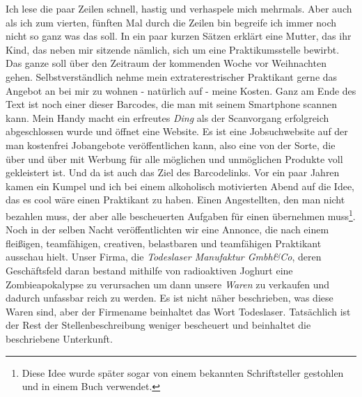 \documentclass[11pt]{article}
\begin{document}
\noindent Ich lese die paar Zeilen schnell, hastig und verhaspele mich
mehrmals. Aber auch als ich zum vierten, fünften Mal durch die Zeilen
bin begreife ich immer noch nicht so ganz was das soll. In ein paar
kurzen Sätzen erklärt eine Mutter, das ihr Kind, das neben mir
sitzende nämlich, sich um eine Praktikumsstelle bewirbt. Das ganze
soll über den Zeitraum der kommenden Woche vor Weihnachten gehen. 
Selbstverständlich nehme mein extraterestrischer Praktikant gerne das
Angebot an bei mir zu wohnen - natürlich auf - meine Kosten. 
Ganz am Ende des Text ist noch einer dieser Barcodes,
die man mit seinem Smartphone scannen kann. 
Mein Handy macht ein erfreutes \emph{Ding} als der Scanvorgang
erfolgreich abgeschlossen wurde und öffnet eine Website. Es ist eine
Jobsuchwebsite auf der man kostenfrei Jobangebote veröffentlichen
kann, also eine von der Sorte, die über und über mit Werbung für alle
möglichen und unmöglichen Produkte voll gekleistert ist. Und da ist
auch das Ziel des Barcodelinks. Vor ein paar Jahren kamen ein Kumpel
und ich bei einem alkoholisch motivierten Abend auf die Idee, das es
cool wäre einen Praktikant zu haben. Einen Angestellten, den man nicht
bezahlen muss, der aber alle bescheuerten Aufgaben für einen
übernehmen muss\footnote{Diese Idee wurde später sogar von einem bekannten
Schriftsteller gestohlen und in einem Buch verwendet.}. Noch in der selben Nacht veröffentlichten wir
eine Annonce, die nach einem fleißigen, teamfähigen, creativen,
belastbaren und teamfähigen Praktikant ausschau hielt. Unser Firma, 
die \emph{Todeslaser Manufaktur Gmbh\&Co}, deren Geschäftsfeld daran bestand
mithilfe von radioaktiven Joghurt eine Zombieapokalypse zu verursachen
um dann unsere \emph{Waren} zu verkaufen und dadurch unfassbar reich zu
werden. Es ist nicht näher beschrieben, was diese Waren sind, aber der
Firmename beinhaltet das Wort Todeslaser. Tatsächlich ist der Rest der 
Stellenbeschreibung weniger bescheuert und beinhaltet die beschriebene 
Unterkunft. 
\end{document}
